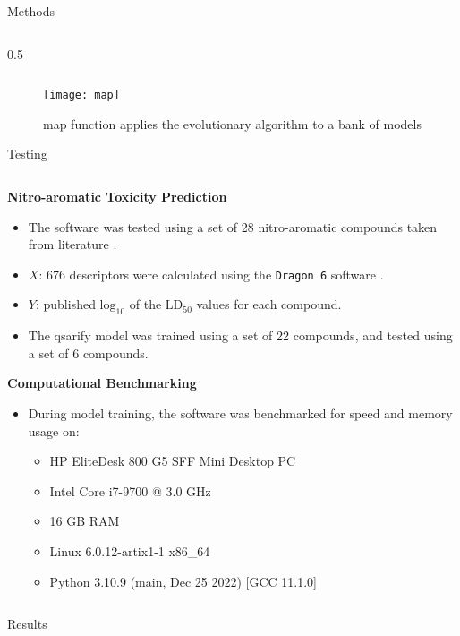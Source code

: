 \documentclass[final]{beamer}
\newlength{\colwidth}
\begin{document}
\begin{frame}[t]
\begin{columns}[t]
\begin{column}{\colwidth}
\begin{block}{Methods}
\begin{columns}[t]
\begin{column}{0.5\colwidth}
					\end{column}
				\end{columns}
						\begin{figure}
						\centering
						\texttt{[image: map]}
						\caption{map function applies the evolutionary algorithm to a bank of models}
						\end{figure}
			\end{block}
			\begin{block}{Testing}
				\begin{columns}[t]
					\begin{column}{\colwidth}
						\large{\bfseries{Nitro-aromatic Toxicity Prediction}} \smallskip
						\begin{itemize}
							\item The software was tested using a set of 28 nitro-aromatic compounds taken from literature \cite{rasulev2006}.
							\item $X$: 676 descriptors were calculated using the \texttt{Dragon 6} software \cite{dragon6}.
							\item $Y$: published $\text{log}_{10}$ of the $\text{LD}_{50}$ values for each compound.
							\item The qsarify model was trained using a set of 22 compounds, and tested using a set of 6 compounds.
						\end{itemize}
						\large{\bfseries{Computational Benchmarking}} \smallskip
						\begin{itemize}
							\item During model training, the software was benchmarked for speed and memory usage on:
							\begin{itemize}
								\item HP EliteDesk 800 G5 SFF Mini Desktop PC
								\item Intel Core i7-9700 @ 3.0 GHz
								\item 16 GB RAM
								\item Linux 6.0.12-artix1-1 x86\_64
								\item Python 3.10.9 (main, Dec 25 2022) [GCC 11.1.0]
							\end{itemize}
						\end{itemize}
						\end{column}
					\end{columns}
				\end{block}
			\begin{block}{Results}



\end{block}
\end{column}
\end{columns}
\end{frame}
\end{document}

